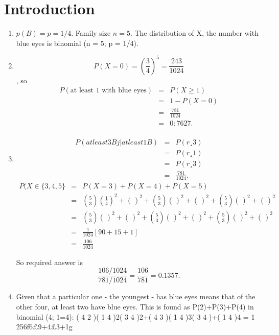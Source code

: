 \documentclass[a4paper,12pt]{article}
\begin{document}
\section{Introduction}
\begin{enumerate}
\item $p(B) = p = 1/4$. Family size $n = 5$. 
The distribution of X, the number with blue
eyes is binomial (n = 5; p = 1/4).

\item \[P(X=0) = \left(\frac{3}{4}\right)^5 = \frac{243}{1024} \], so 
\begin{eqnarray*}
P(\mbox{at least 1 with blue eyes}) 
&=& P(X\geq 1) \\
&=& 1 - P(X=0)\\ 
&=& \frac{781}{1024}\\
&=& 0:7627.\\
\end{eqnarray*}
\item  
\begin{eqnarray*}
P(at least 3 B j | at least 1 B)&=&P(r ¸ 3)\\
&=&P(r ¸ 1)\\ 
&=& P(r¸3)\\
&=& \frac{781}{1024}.
\end{eqnarray*}
\begin{eqnarray*}
P(X \in \{3,4,5\} &=&  P(X=3) + P(X=4) + P(X=5)\\
&=& {5 \choose 3} \left(\frac{1}{4}\right)^2 + \left(\frac{}{}\right)^2 + {5 \choose 3} \left(\frac{}{}\right)^2 + \left(\frac{}{}\right)^2 + {5 \choose 3} \left(\frac{}{}\right)^2 + \left(\frac{}{}\right)^2\\
&=& {5 \choose 3} \left(\frac{}{}\right)^2 + \left(\frac{}{}\right)^2 + {5 \choose 3} \left(\frac{}{}\right)^2 + \left(\frac{}{}\right)^2 + {5 \choose 3} \left(\frac{}{}\right)^2 + \left(\frac{}{}\right)^2\\
&=& \frac{1}{1024} \left[ 90 + 15 + 1 \right] \\
&=& \frac{106}{1024}
\end{eqnarray*}

So required answer is \[ \frac{106/1024}{781/1024} = \frac{106}{781} = 0.1357. \]
\item Given that a particular one - the youngest - has blue eyes means that of the
other four, at least two have blue eyes. This is found as P(2)+P(3)+P(4) in
binomial (4; 1=4): ( 4
2 )( 1
4 )2( 3
4 )2+( 4
3 )( 1
4 )3( 3
4 )+( 1
4 )4 = 1
256f6£9+4£3+1g



\end{enumerate}
\end{document}
